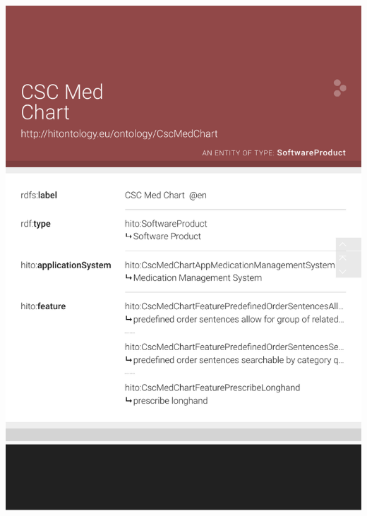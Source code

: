 \documentclass[aspectratio=1610,handout]{beamer}
\begin{document}
\begin{frame}[plain]
\begin{columns}
 \begin{column}{.55\textwidth}
  \centering\includegraphics[width=1.0\textwidth,height=1.0\textheight,keepaspectratio,trim=0 100 0 0,clip]{cscmedchart-lodview.pdf}
 \end{column}
 

\end{columns}
\end{frame}
\end{document}
